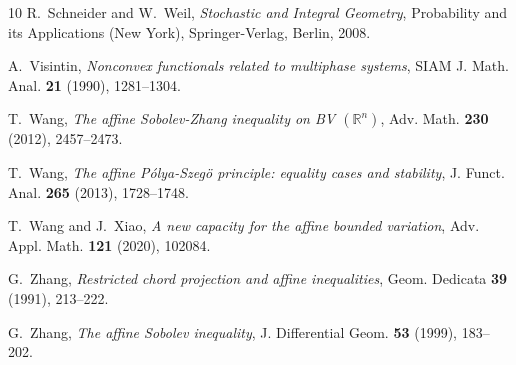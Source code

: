 \documentclass{amsart}
\begin{document}
\begin{thebibliography}{10}
R.~Schneider and W.~Weil, {\em Stochastic and Integral Geometry}, Probability
and its Applications (New York), Springer-Verlag, Berlin, 2008.

A.~Visintin, {\em Nonconvex functionals related to multiphase systems},
SIAM J. Math. Anal. \textbf{21} (1990), 1281--1304.

T.~Wang, {\em The affine Sobolev-Zhang inequality on BV $({
\mathbb R}^{n})$}, Adv. Math. \textbf{230} (2012), 2457--2473.

T.~Wang, {\em The affine P\'olya-Szeg\"o principle: equality cases
and stability}, J. Funct. Anal. \textbf{265} (2013), 1728--1748.

T.~Wang and J.~Xiao, {\em A new capacity for the affine bounded variation},
Adv. Appl. Math. \textbf{121} (2020), 102084.

G.~Zhang, {\em Restricted chord projection and affine inequalities}, Geom.
Dedicata \textbf{39} (1991), 213--222.

G.~Zhang, {\em The affine Sobolev inequality}, J. Differential Geom.
\textbf{53} (1999), 183--202.

\end{thebibliography}
\end{document}
